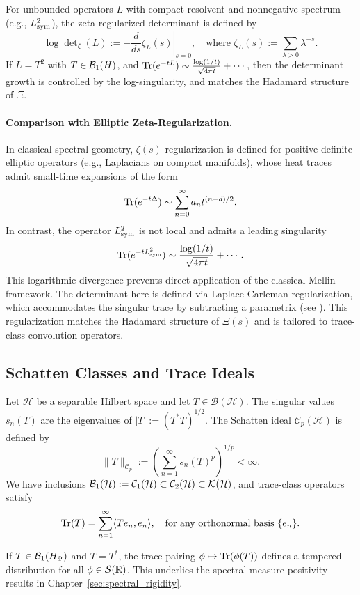 For unbounded operators \( L \) with compact resolvent and nonnegative spectrum (e.g., \( L_{\mathrm{sym}}^2 \)), the zeta-regularized determinant is defined by
\[
\log \det\nolimits_\zeta(L) := - \left. \frac{d}{ds} \zeta_L(s) \right|_{s=0}, \quad \text{where } \zeta_L(s) := \sum_{\lambda > 0} \lambda^{-s}.
\]
If \( L = T^2 \) with \( T \in \mathcal{B}_1(H) \), and \( \operatorname{Tr}(e^{-tL}) \sim \frac{\log(1/t)}{\sqrt{4\pi t}} + \cdots \), then the determinant growth is controlled by the log-singularity, and matches the Hadamard structure of \( \Xi \).

\paragraph{Comparison with Elliptic Zeta-Regularization.}
In classical spectral geometry, \( \zeta(s) \)-regularization is defined for positive-definite elliptic operators (e.g., Laplacians on compact manifolds), whose heat traces admit small-time expansions of the form
\[
\operatorname{Tr}(e^{-t\Delta}) \sim \sum_{n=0}^\infty a_n t^{(n-d)/2}.
\]
In contrast, the operator \( L_{\mathrm{sym}}^2 \) is not local and admits a leading singularity
\[
\operatorname{Tr}(e^{-t L_{\mathrm{sym}}^2}) \sim \frac{\log(1/t)}{\sqrt{4\pi t}} + \cdots.
\]
This logarithmic divergence prevents direct application of the classical Mellin framework. The determinant here is defined via Laplace-Carleman regularization, which accommodates the singular trace by subtracting a parametrix (see ). This regularization matches the Hadamard structure of \( \Xi(s) \) and is tailored to trace-class convolution operators.

\subsection*{Schatten Classes and Trace Ideals}

Let \( \mathcal{H} \) be a separable Hilbert space and let \( T \in \mathcal{B}(\mathcal{H}) \). The singular values \( s_n(T) \) are the eigenvalues of \( |T| := (T^*T)^{1/2} \). The Schatten ideal \( \mathcal{C}_p(\mathcal{H}) \) is defined by
\[
\|T\|_{\mathcal{C}_p} := \left( \sum_{n=1}^\infty s_n(T)^p \right)^{1/p} < \infty.
\]
We have inclusions \( \mathcal{B}_1(\mathcal{H}) := \mathcal{C}_1(\mathcal{H}) \subset \mathcal{C}_2(\mathcal{H}) \subset \mathcal{K}(\mathcal{H}) \), and trace-class operators satisfy
\[
\operatorname{Tr}(T) = \sum_{n=1}^\infty \langle T e_n, e_n \rangle, \quad \text{for any orthonormal basis } \{ e_n \}.
\]

If \( T \in \mathcal{B}_1(H_{\Psi}) \) and \( T = T^* \), the trace pairing \( \phi \mapsto \operatorname{Tr}(\phi(T)) \) defines a tempered distribution for all \( \phi \in \mathcal{S}(\mathbb{R}) \). This underlies the spectral measure positivity results in Chapter~\ref{sec:spectral_rigidity}.
